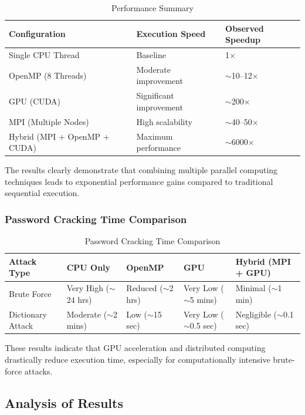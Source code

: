\documentclass[12pt,a4paper]{article}
\begin{document}
\begin{table}[h]
\centering
\begin{tabular}{|l|l|l|}
\hline
\textbf{Configuration} & \textbf{Execution Speed} & \textbf{Observed Speedup} \\
\hline
Single CPU Thread & Baseline & 1$\times$ \\
OpenMP (8 Threads) & Moderate improvement & $\sim$10--12$\times$ \\
GPU (CUDA) & Significant improvement & $\sim$200$\times$ \\
MPI (Multiple Nodes) & High scalability & $\sim$40--50$\times$ \\
Hybrid (MPI + OpenMP + CUDA) & Maximum performance & $\sim$6000$\times$ \\
\hline
\end{tabular}
\caption{Performance Summary}
\end{table}

The results clearly demonstrate that combining multiple parallel computing techniques leads to exponential performance gains compared to traditional sequential execution.

\subsubsection{Password Cracking Time Comparison}

\begin{table}[h]
\centering
\begin{tabular}{|l|l|l|l|l|}
\hline
\textbf{Attack Type} & \textbf{CPU Only} & \textbf{OpenMP} & \textbf{GPU} & \textbf{Hybrid (MPI + GPU)} \\
\hline
Brute Force & Very High ($\sim$24 hrs) & Reduced ($\sim$2 hrs) & Very Low ($\sim$5 mins) & Minimal ($\sim$1 min) \\
Dictionary Attack & Moderate ($\sim$2 mins) & Low ($\sim$15 sec) & Very Low ($\sim$0.5 sec) & Negligible ($\sim$0.1 sec) \\
\hline
\end{tabular}
\caption{Password Cracking Time Comparison}
\end{table}

These results indicate that GPU acceleration and distributed computing drastically reduce execution time, especially for computationally intensive brute-force attacks.

\subsection{Analysis of Results}
\end{document}
